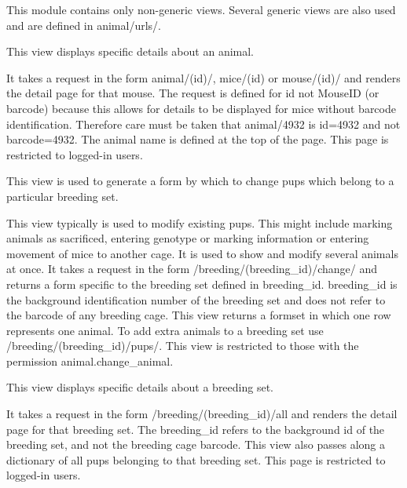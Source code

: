 \documentclass[letterpaper,10pt,english]{sphinxmanual}
\begin{document}
This module contains only non-generic views.  Several generic views are also used and are defined in animal/urls/.

\begin{fulllineitems}
\label{api:animal.views.animal_detail}
This view displays specific details about an animal.

It takes a request in the form animal/(id)/, mice/(id) or mouse/(id)/ and renders the detail page for that mouse.  The request is defined for id not MouseID (or barcode) because this allows for details to be displayed for mice without barcode identification.
Therefore care must be taken that animal/4932 is id=4932 and not barcode=4932.  The animal name is defined at the top of the page.
This page is restricted to logged-in users.

\end{fulllineitems}


\begin{fulllineitems}
\label{api:animal.views.breeding_change}
This view is used to generate a form by which to change pups which belong to a particular breeding set.

This view typically is used to modify existing pups.  This might include marking animals as sacrificed, entering genotype or marking information or entering movement of mice to another cage.  It is used to show and modify several animals at once.
It takes a request in the form /breeding/(breeding\_id)/change/ and returns a form specific to the breeding set defined in breeding\_id.  breeding\_id is the background identification number of the breeding set and does not refer to the barcode of any breeding cage.
This view returns a formset in which one row represents one animal.  To add extra animals to a breeding set use /breeding/(breeding\_id)/pups/.
This view is restricted to those with the permission animal.change\_animal.

\end{fulllineitems}


\begin{fulllineitems}
\label{api:animal.views.breeding_detail}
This view displays specific details about a breeding set.

It takes a request in the form /breeding/(breeding\_id)/all and renders the detail page for that breeding set.
The breeding\_id refers to the background id of the breeding set, and not the breeding cage barcode.
This view also passes along a dictionary of all pups belonging to that breeding set.
This page is restricted to logged-in users.

\end{fulllineitems}
\end{document}
